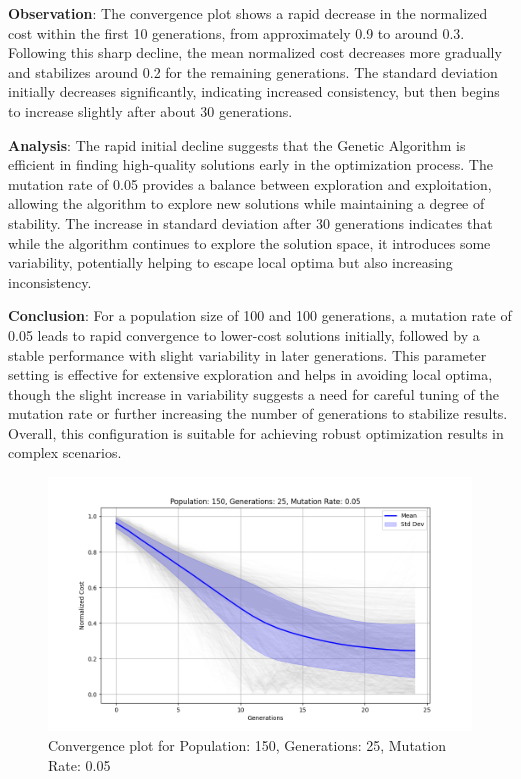 \documentclass[
]{article}
\begin{document}
    \textbf{Observation}: The convergence plot shows a rapid decrease in the normalized cost within the first 10 generations, from approximately 0.9 to around 0.3. Following this sharp decline, the mean normalized cost decreases more gradually and stabilizes around 0.2 for the remaining generations. The standard deviation initially decreases significantly, indicating increased consistency, but then begins to increase slightly after about 30 generations.

    \textbf{Analysis}: The rapid initial decline suggests that the Genetic Algorithm is efficient in finding high-quality solutions early in the optimization process. The mutation rate of 0.05 provides a balance between exploration and exploitation, allowing the algorithm to explore new solutions while maintaining a degree of stability. The increase in standard deviation after 30 generations indicates that while the algorithm continues to explore the solution space, it introduces some variability, potentially helping to escape local optima but also increasing inconsistency.

    \textbf{Conclusion}: For a population size of 100 and 100 generations, a mutation rate of 0.05 leads to rapid convergence to lower-cost solutions initially, followed by a stable performance with slight variability in later generations. This parameter setting is effective for extensive exploration and helps in avoiding local optima, though the slight increase in variability suggests a need for careful tuning of the mutation rate or further increasing the number of generations to stabilize results. Overall, this configuration is suitable for achieving robust optimization results in complex scenarios.

    \begin{figure}[H]
        \centering
        \includegraphics[width=\textwidth]{genetic_algorithm/Population_150_Generations_25_MutationRate_0.05}
        \caption{Convergence plot for Population: 150, Generations: 25, Mutation Rate: 0.05}
        \label{fig:ga_150_25_05}
    \end{figure}
\end{document}
